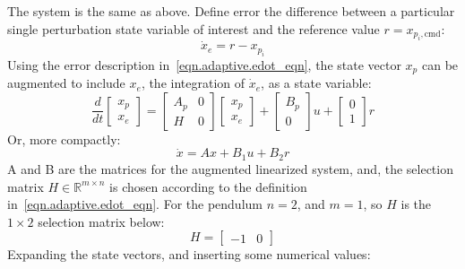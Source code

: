 The system is the same as above.
Define error the difference between a particular single perturbation state variable of interest and the reference value $r=x_{p_{i},\text{cmd}}$:
\begin{equation}\label{eqn.adaptive.edot_eqn}
  \dot{x}_{e}=r-x_{p_{i}}
\end{equation}
Using the error description in~\eqref{eqn.adaptive.edot_eqn}, the state vector $x_{p}$ can be augmented to include $x_{e}$, the integration of $\dot{x}_{e}$, as a state variable:
\begin{equation}\label{lqrpi_linear_ss_eqn}
  \frac{d}{dt}
  \begin{bmatrix}
    x_{p} \\
    x_{e}
  \end{bmatrix} =
  \begin{bmatrix}
    A_{p} & 0 \\
    H & 0
  \end{bmatrix}
  \begin{bmatrix}
    x_{p} \\
    x_{e}
  \end{bmatrix}+
  \begin{bmatrix}
    B_{p} \\
    0
  \end{bmatrix}u+
  \begin{bmatrix}
    0 \\
    1
  \end{bmatrix}r
\end{equation}
Or, more compactly:
\begin{equation}\label{eqn.adaptive.lqrpiss}
  \dot{x}=Ax+B_{1}u+B_{2}r
\end{equation}
A and B are the matrices for the augmented linearized system, and, the selection matrix $H \in \mathbb{R}^{m\times n}$ is chosen according to the definition in~\eqref{eqn.adaptive.edot_eqn}.
For the pendulum $n=2$, and $m=1$, so $H$ is the $1\times 2$ selection matrix below:
\begin{equation*}
  H=
  \begin{bmatrix}
    -1 & 0
  \end{bmatrix}
\end{equation*}
Expanding the state vectors, and inserting some numerical values:
